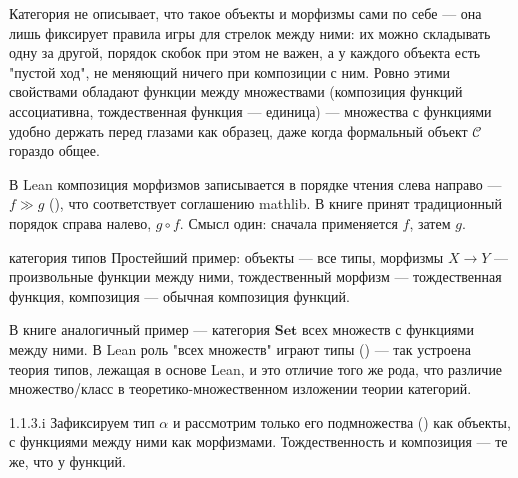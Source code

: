 \begin{intuition}
Категория не описывает, что такое объекты и морфизмы сами по себе — она лишь фиксирует
правила игры для стрелок между ними: их можно складывать одну за другой, порядок
скобок при этом не важен, а у каждого объекта есть "пустой ход", не меняющий ничего при
композиции с ним. Ровно этими свойствами обладают функции между множествами (композиция
функций ассоциативна, тождественная функция — единица) — множества с функциями удобно
держать перед глазами как образец, даже когда формальный объект $\mathcal{C}$ гораздо
общее.

\begin{center}
\end{center}
\end{intuition}

\begin{remark}
В Lean композиция морфизмов записывается в порядке чтения слева направо — $f \gg g$
(), что соответствует соглашению mathlib. В книге принят традиционный
порядок справа налево, $g \circ f$. Смысл один: сначала применяется $f$, затем $g$.
\end{remark}

\begin{example*}{категория типов}
Простейший пример: объекты — все типы, морфизмы $X \to Y$ — произвольные функции между
ними, тождественный морфизм — тождественная функция, композиция — обычная композиция
функций.
\end{example*}

\begin{remark}
В книге аналогичный пример — категория $\mathbf{Set}$ всех множеств с функциями между
ними. В Lean роль "всех множеств" играют типы () — так устроена теория
типов, лежащая в основе Lean, и это отличие того же рода, что различие
множество/класс в теоретико-множественном изложении теории категорий.
\end{remark}

\begin{example}{1.1.3.i}{}
Зафиксируем тип $\alpha$ и рассмотрим только его подмножества () как
объекты, с функциями между ними как морфизмами. Тождественность и композиция — те же,
что у функций.
\end{example}

